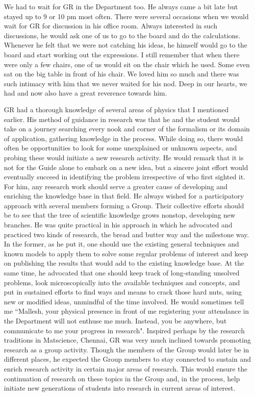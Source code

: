 We had to wait for GR in the Department too. He always came a bit late but stayed up to 9 or 10 pm most often. There were several occasions when we would wait for GR for discussion in his office room. Always interested in such discussions, he would ask one of us to go to the board and do the calculations. Whenever he felt that we were not catching his ideas, he himself would go to the board and start working out the expressions. I still remember that when there were only a few chairs, one of us would sit on the chair which he used. Some even sat on the big table in front of his chair. We loved him so much and there was such intimacy with him that we never waited for his nod. Deep in our hearts, we had and now also have a great reverence towards him.

GR had a thorough knowledge of several areas of physics that I mentioned earlier. His method of guidance in research was that he and the student would take on a journey searching every nook and corner of the formalism or its domain of application, gathering knowledge in the process. While doing so, there would often be opportunities to look for some unexplained or unknown aspects, and probing these would initiate a new research activity. He would remark that it is not for the Guide alone to embark on a new idea, but a sincere joint effort would eventually succeed in identifying the problem irrespective of who first sighted it. For him, any research work should serve a greater cause of developing and enriching the knowledge base in that field. He always wished for a participatory approach with several members forming a Group. Their collective efforts should be to see that the tree of scientific knowledge grows nonstop, developing new branches. He was quite practical in his approach in which he advocated and practiced two kinds of research, the bread and butter way and the milestone way. In the former, as he put it, one should use the existing general techniques and known models to apply them to solve some regular problems of interest and keep on publishing the results that would add to the existing knowledge base. At the same time, he advocated that one should keep track of long-standing unsolved problems, look microscopically into the available techniques and concepts, and put in sustained efforts to find ways and means to crack those hard nuts, using new or modified ideas, unmindful of the time involved. He would sometimes tell me ``Mallesh, your physical presence in front of me registering your attendance in the Department will not enthuse me much. Instead, you be anywhere, but communicate to me your progress in research". Inspired perhaps by the research traditions in Matscience, Chennai, GR was very much inclined towards promoting research as a group activity. Though the members of the Group would later be in different places, he expected the Group members to stay connected to sustain and enrich research activity in certain major areas of research. This would ensure the continuation of research on these topics in the Group and, in the process, help initiate new generations of students into research in current areas of interest.

